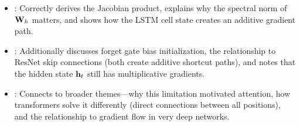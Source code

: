 \begin{interviewq}
\goodgreat
\begin{itemize}
\item {}: Correctly derives the Jacobian product, explains
  why the spectral norm of $\mathbf{W}_h$ matters, and shows how the LSTM cell
  state creates an additive gradient path.
\item {}: Additionally discusses forget gate bias
  initialization, the relationship to ResNet skip connections (both create
  additive shortcut paths), and notes that the hidden state $\mathbf{h}_t$ still
  has multiplicative gradients.
\item {}: Connects to broader themes---why this limitation
  motivated attention, how transformers solve it differently (direct
  connections between all positions), and the relationship to gradient
  flow in very deep networks.
\end{itemize}

\end{interviewq}

